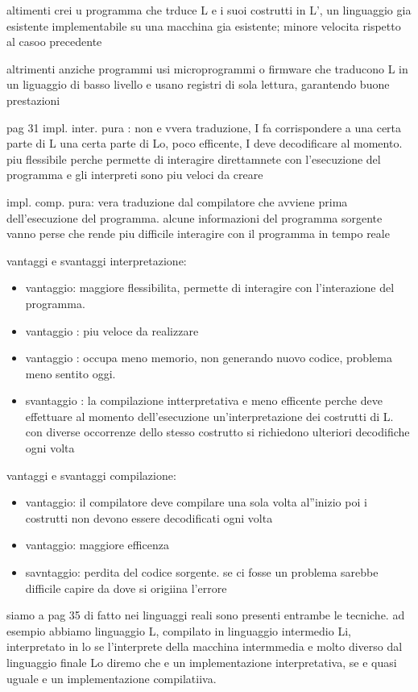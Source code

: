 \documentclass[12pt]{article}
\begin{document}
altimenti crei u programma che trduce L e i suoi costrutti in L’, un linguaggio gia esistente implementabile su una macchina gia esistente; minore velocita rispetto al casoo precedente

altrimenti anziche programmi usi microprogrammi o firmware che traducono L in un liguaggio di basso livello e usano registri di sola lettura, garantendo buone prestazioni

pag 31 impl. inter. pura : non e vvera traduzione, I fa corrispondere a una certa parte di L una certa parte di Lo, poco efficente, I deve decodificare al momento. piu flessibile perche permette di  interagire direttamnete con l’esecuzione del programma e gli interpreti sono piu veloci da creare

impl. comp. pura: vera traduzione dal compilatore che avviene prima dell’esecuzione del programma. alcune informazioni del programma sorgente vanno perse che rende piu difficile interagire con il programma in tempo reale

vantaggi e svantaggi interpretazione:
\begin{itemize}

\item vantaggio: maggiore flessibilita, permette di interagire con l'interazione del programma.
\item vantaggio : piu veloce da realizzare
\item vantaggio : occupa meno memorio, non generando nuovo codice, problema meno sentito oggi.
\item svantaggio : la compilazione intterpretativa e meno efficente perche deve effettuare al momento dell'esecuzione un'interpretazione dei costrutti di L.
con diverse occorrenze dello stesso costrutto si richiedono ulteriori decodifiche ogni volta
\end{itemize}
vantaggi e svantaggi compilazione:
\begin{itemize}
\item vantaggio: il compilatore deve compilare una sola volta al''inizio poi i costrutti non devono essere decodificati ogni  volta
\item vantaggio: maggiore efficenza
\item savntaggio: perdita del codice sorgente.
se ci fosse un problema sarebbe difficile capire da dove si origiina l'errore
\end{itemize}

siamo a pag 35
di fatto nei linguaggi reali sono presenti entrambe le tecniche.
ad esempio abbiamo linguaggio L, compilato in linguaggio intermedio Li, interpretato in lo
se l'interprete della macchina intermmedia e molto diverso dal linguaggio finale Lo diremo che e un implementazione interpretativa, se e quasi uguale e un implementazione compilatiiva.
\end{document}
